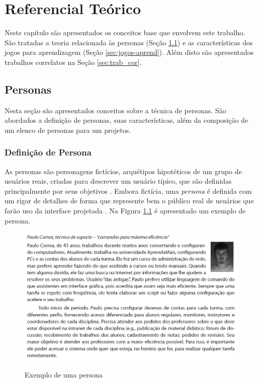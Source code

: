 \chapter{Referencial Teórico}
\label{chap:ref}


Neste capítulo são apresentados os conceitos base que envolvem este trabalho. São tratadas a teoria relacionada às personas (Seção \ref{sec:personas}) e as características dos jogos para aprendizagem (Seção \ref{sec:jogos-aprend}). Além disto são apresentados trabalhos correlatos na Seção \ref{sec:trab_cor}. 

\section{Personas}
\label{sec:personas}

Nesta seção são apresentados conceitos sobre a técnica de personas. São abordados a definição de personas, suas características, além da composição de um elenco de personas para um projetos.

\subsection{Definição de Persona}

As personas são personagens fictícios, arquétipos hipotéticos de um grupo de usuários reais, criadas para descrever um usuário típico, que são definidas principalmente por seus objetivos \cite{cooper07, pruitt, cooper99}. Embora fictícia, uma \textit{persona} é definida com um rigor de detalhes de forma que represente bem o público real de usuários que farão uso da interface projetada \cite[p. 154]{BarbosaEtAl2021}. Na Figura \ref{Fig:ex-persona.png} é apresentado um exemplo de persona.

\begin{figure}[htbp]
	\centering
	\caption{Exemplo de uma persona}
	\includegraphics[keepaspectratio=true,scale=0.6]{figuras/metodologia/exemplo-persona.png}
	\label{Fig:ex-persona.png}
\end{figure}

